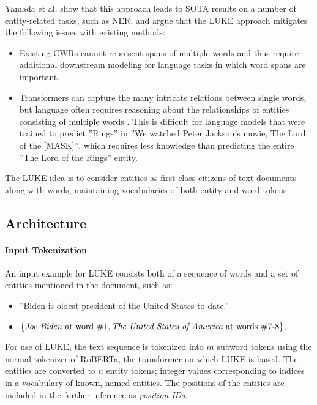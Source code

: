 \documentclass[main.tex]{subfiles}
\begin{document}
Yamada et al. show that this approach leads to SOTA results on a number of entity-related tasks, such as NER, and argue that the LUKE approach mitigates the following issues with existing methods:
\begin{itemize}
    \item
        Existing CWRs cannot represent spans of multiple words and thus require additional downstream modeling for language tasks in which word spans are important.
    \item
        Transformers can capture the many intricate relations between single words, but language often requires reasoning about the relationships of entities consisting of multiple words \cite{yamada2020luke}.
        This is difficult for language models that were trained to predict ''Rings'' in ''We watched Peter Jackson's movie, The Lord of the [MASK]'', which requires less knowledge than predicting the entire ''The Lord of the Rings'' entity.
\end{itemize}
The LUKE idea is to consider entities as first-class citizens of text documents along with words, maintaining vocabularies of both entity and word tokens.
\subsection{Architecture}

\paragraph{Input Tokenization}
An input example for LUKE consists both of a sequence of words and a set of entities mentioned in the document, such as:
\begin{itemize}
    \item ''Biden is oldest president of the United States to date.''
    \item $\{\text{\emph{Joe Biden} at word \#1}, \text{\emph{The United States of America} at words \#7-8}\}$.
\end{itemize}
For use of LUKE, the text sequence is tokenized into $m$ subword tokens using the normal tokenizer of RoBERTa, the transformer on which LUKE is based.
The entities are converted to $n$ entity tokens; integer values corresponding to indices in a vocabulary of known, named entities.
The positions of the entities are included in the further inference as \emph{position IDs}.
\end{document}
